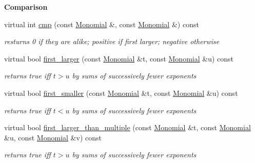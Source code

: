 \begin{Indent}{\bf Comparison}\par
\begin{DoxyCompactItemize}
\item 
virtual int \hyperlink{class_w_grevlex___ordering_abfb8147aef23b495123e5c0f0c03388c}{cmp} (const \hyperlink{class_monomial}{Monomial} \&, const \hyperlink{class_monomial}{Monomial} \&) const \hypertarget{class_w_grevlex___ordering_abfb8147aef23b495123e5c0f0c03388c}{}\label{class_w_grevlex___ordering_abfb8147aef23b495123e5c0f0c03388c}

\begin{DoxyCompactList}\small\item\em resturns 0 if they are alike; positive if first larger; negative otherwise \end{DoxyCompactList}\item 
virtual bool \hyperlink{class_w_grevlex___ordering_acc9ecfc8cdfb38ff0635e801182d05ee}{first\+\_\+larger} (const \hyperlink{class_monomial}{Monomial} \&t, const \hyperlink{class_monomial}{Monomial} \&u) const \hypertarget{class_w_grevlex___ordering_acc9ecfc8cdfb38ff0635e801182d05ee}{}\label{class_w_grevlex___ordering_acc9ecfc8cdfb38ff0635e801182d05ee}

\begin{DoxyCompactList}\small\item\em returns {\ttfamily true} iff $t>u$ by sums of successively fewer exponents \end{DoxyCompactList}\item 
virtual bool \hyperlink{class_w_grevlex___ordering_ae898ebdf9736ca6bff905cdcca5eacc9}{first\+\_\+smaller} (const \hyperlink{class_monomial}{Monomial} \&t, const \hyperlink{class_monomial}{Monomial} \&u) const \hypertarget{class_w_grevlex___ordering_ae898ebdf9736ca6bff905cdcca5eacc9}{}\label{class_w_grevlex___ordering_ae898ebdf9736ca6bff905cdcca5eacc9}

\begin{DoxyCompactList}\small\item\em returns {\ttfamily true} iff $t< u$ by sums of successively fewer exponents \end{DoxyCompactList}\item 
virtual bool \hyperlink{class_w_grevlex___ordering_a40b9a3fa09f8181a0012c5340cace6cb}{first\+\_\+larger\+\_\+than\+\_\+multiple} (const \hyperlink{class_monomial}{Monomial} \&t, const \hyperlink{class_monomial}{Monomial} \&u, const \hyperlink{class_monomial}{Monomial} \&v) const \hypertarget{class_w_grevlex___ordering_a40b9a3fa09f8181a0012c5340cace6cb}{}\label{class_w_grevlex___ordering_a40b9a3fa09f8181a0012c5340cace6cb}

\begin{DoxyCompactList}\small\item\em returns {\ttfamily true} iff $t>u$ by sums of successively fewer exponents \end{DoxyCompactList}\end{DoxyCompactItemize}
\end{Indent}
